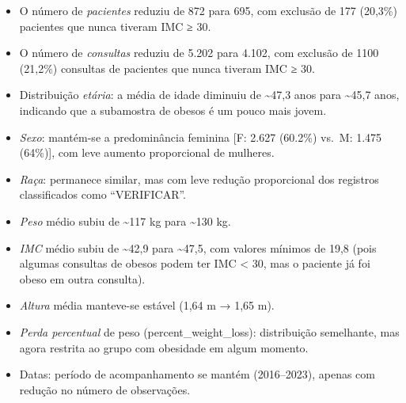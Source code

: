 \documentclass[
]{article}
\providecommand{\tightlist}{%
  \setlength{\itemsep}{0pt}\setlength{\parskip}{0pt}}\usepackage{longtable,booktabs,array}
\begin{document}
\begin{itemize}
\tightlist
\item
  O número de \emph{pacientes} reduziu de 872 para 695, com exclusão de
  177 (20,3\%) pacientes que nunca tiveram IMC ≥ 30.
\item
  O número de \emph{consultas} reduziu de 5.202 para 4.102, com exclusão
  de 1100 (21,2\%) consultas de pacientes que nunca tiveram IMC ≥ 30.
\item
  Distribuição \emph{etária}: a média de idade diminuiu de
  \textasciitilde47,3 anos para \textasciitilde45,7 anos, indicando que
  a subamostra de obesos é um pouco mais jovem.
\item
  \emph{Sexo}: mantém-se a predominância feminina {[}F: 2.627 (60.2\%)
  vs.~M: 1.475 (64\%){]}, com leve aumento proporcional de mulheres.
\item
  \emph{Raça}: permanece similar, mas com leve redução proporcional dos
  registros classificados como ``VERIFICAR''.
\item
  \emph{Peso} médio subiu de \textasciitilde117 kg para
  \textasciitilde130 kg.
\item
  \emph{IMC} médio subiu de \textasciitilde42,9 para
  \textasciitilde47,5, com valores mínimos de 19,8 (pois algumas
  consultas de obesos podem ter IMC \textless{} 30, mas o paciente já
  foi obeso em outra consulta).
\item
  \emph{Altura} média manteve-se estável (1,64 m → 1,65 m).
\item
  \emph{Perda percentual} de peso (percent\_weight\_loss): distribuição
  semelhante, mas agora restrita ao grupo com obesidade em algum
  momento.
\item
  Datas: período de acompanhamento se mantém (2016--2023), apenas com
  redução no número de observações.
\end{itemize}
\end{document}
